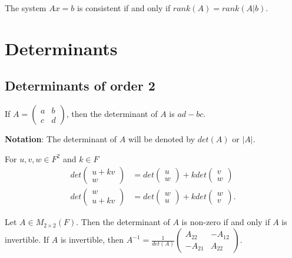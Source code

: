 \documentclass[12pt]{article}
\newenvironment{theorem}[2][Theorem]{\begin{trivlist}
\item[\hskip \labelsep {\bfseries #1}\hskip \labelsep {\bfseries #2.}]}{\end{trivlist}}
\newenvironment{definition}[2][Definition]{\begin{trivlist}
\item[\hskip \labelsep {\bfseries #1}\hskip \labelsep {\bfseries #2}]}{\end{trivlist}}
\begin{document}
\begin{theorem}{3.11}
The system $Ax = b$ is consistent if and only if $rank(A) = rank(A | b)$.
\end{theorem}

\section{Determinants}
\subsection{Determinants of order 2}

\begin{definition}{1}
If $A = \begin{pmatrix}
a & b \\
c & d
\end{pmatrix}$, then the determinant of $A$ is $ad-bc$.
\end{definition}

\textbf{Notation}: The determinant of $A$ will be denoted by $det(A)$ or $\lvert A \rvert$.

\begin{theorem}{4.1}
For $u, v, w \in F^2$ and $k \in F$
\begin{align*}
    det \begin{pmatrix}
    u + kv \\ w
    \end{pmatrix} &= det \begin{pmatrix}
    u \\ w
    \end{pmatrix} + kdet \begin{pmatrix}
    v \\ w
    \end{pmatrix} \\ 
    det \begin{pmatrix}
    w \\ u + kv
    \end{pmatrix} &= det \begin{pmatrix}
    w \\ u
    \end{pmatrix} + kdet \begin{pmatrix}
    w \\ v
    \end{pmatrix}.
\end{align*}
\end{theorem}

\begin{theorem}{4.2}
Let $A \in M_{2 \times 2}(F)$. Then the determinant of $A$ is non-zero if and only if $A$ is invertible. If $A$ is invertible, then $A^{-1} = \frac{1}{det(A)}\begin{pmatrix}
A_{22} & -A_{12} \\ -A_{21} & A_{22}
\end{pmatrix}$.
\end{theorem}
\end{document}
